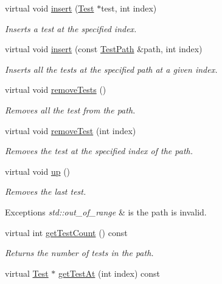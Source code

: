 \begin{DoxyCompactItemize}
virtual void \hyperlink{class_test_path_a6591fc81038f8b29e64becbfe1e2f740}{insert} (\hyperlink{class_test}{Test} $\ast$test, int index)
\begin{DoxyCompactList}\small\item\em Inserts a test at the specified index. \end{DoxyCompactList}\item 
virtual void \hyperlink{class_test_path_af107ea8a2ce40414e1d59a05c6deec0c}{insert} (const \hyperlink{class_test_path}{Test\+Path} \&path, int index)
\begin{DoxyCompactList}\small\item\em Inserts all the tests at the specified path at a given index. \end{DoxyCompactList}\item 
virtual void \hyperlink{class_test_path_a98bbd84f8dea8793cfda496ecea1be75}{remove\+Tests} ()
\begin{DoxyCompactList}\small\item\em Removes all the test from the path. \end{DoxyCompactList}\item 
virtual void \hyperlink{class_test_path_afd1769a314ef84b6cbdd01af35009a0e}{remove\+Test} (int index)
\begin{DoxyCompactList}\small\item\em Removes the test at the specified index of the path. \end{DoxyCompactList}\item 
virtual void \hyperlink{class_test_path_a396e9d13b59f5e534582e80e3f1a2c42}{up} ()
\begin{DoxyCompactList}\small\item\em Removes the last test. 
\begin{DoxyExceptions}{Exceptions}
{\em std\+::out\+\_\+of\+\_\+range} & is the path is invalid. \\
\hline
\end{DoxyExceptions}
\end{DoxyCompactList}\item 
virtual int \hyperlink{class_test_path_aab585e5b6dcc541fd92701173de5628b}{get\+Test\+Count} () const 
\begin{DoxyCompactList}\small\item\em Returns the number of tests in the path. \end{DoxyCompactList}\item 
virtual \hyperlink{class_test}{Test} $\ast$ \hyperlink{class_test_path_a320c9cb5c72b21b59f98fa4c956d0c0b}{get\+Test\+At} (int index) const 

\end{DoxyCompactItemize}
